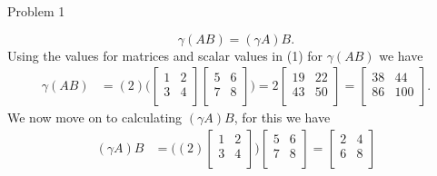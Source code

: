 \begin{problem}{Problem 1}
\begin{highlight}[Solution]
        \begin{equation}
            \gamma (AB) = (\gamma A)B.
        \end{equation}
        Using the values for matrices and scalar values in (1) for $\gamma (AB)$ we have
        \begin{align*}
            \gamma (AB) & = (2)
            \Bigg(
                \begin{bmatrix}
                    1 & 2 \\
                    3 & 4 \\
                \end{bmatrix}
                \begin{bmatrix}
                    5 & 6 \\
                    7 & 8 \\
                \end{bmatrix}
            \Bigg)
            = 2 
            \begin{bmatrix}
                19 & 22 \\
                43 & 50 \\
            \end{bmatrix}
            = 
            \begin{bmatrix}
                38 & 44 \\
                86 & 100 \\
            \end{bmatrix}.
        \end{align*}
        We now move on to calculating $(\gamma A)B$, for this we have
        \begin{align*}
            (\gamma A)B & = 
            \Bigg(
                (2)
                \begin{bmatrix}
                    1 & 2 \\
                    3 & 4 \\
                \end{bmatrix}
            \Bigg)
            \begin{bmatrix}
                5 & 6 \\
                7 & 8 \\
            \end{bmatrix}
            = 
            \begin{bmatrix}
                2 & 4 \\
                6 & 8 \\
            \end{bmatrix}

\end{align*}
\end{highlight}
\end{problem}

